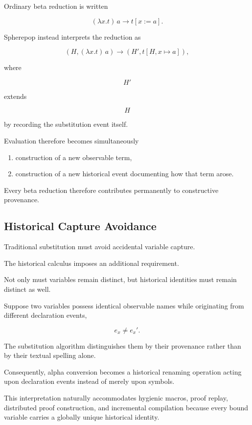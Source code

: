 \documentclass[12pt,oneside]{article}
\theoremstyle{definition}
\theoremstyle{remark}
\begin{document}
Ordinary beta reduction is written

\[
(\lambda x.t)\,a
\longrightarrow
t[x:=a].
\]

Spherepop instead interprets the reduction as

\[
(H,
(\lambda x.t)\,a)
\longrightarrow
(H',
t[H,x\mapsto a]),
\]

where

\[
H'
\]

extends

\[
H
\]

by recording the substitution event itself.

Evaluation therefore becomes simultaneously

\begin{enumerate}[label=(\roman*)]

\item
construction of a new observable term,

\item
construction of a new historical event documenting how that term arose.

\end{enumerate}

Every beta reduction therefore contributes permanently to constructive
provenance.

\subsection{Historical Capture Avoidance}

Traditional substitution must avoid accidental variable capture.

The historical calculus imposes an additional requirement.

Not only must variables remain distinct, but historical identities must remain
distinct as well.

Suppose two variables possess identical observable names while originating from
different declaration events,

\[
e_x
\neq
e_x'.
\]

The substitution algorithm distinguishes them by their provenance rather than by
their textual spelling alone.

Consequently, alpha conversion becomes a historical renaming operation acting
upon declaration events instead of merely upon symbols.

This interpretation naturally accommodates hygienic macros, proof replay,
distributed proof construction, and incremental compilation because every bound
variable carries a globally unique historical identity.
\end{document}
